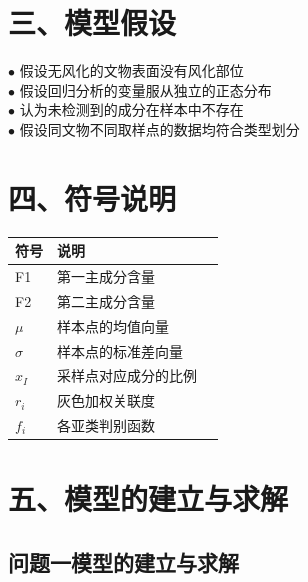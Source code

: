 \documentclass{my_paper}
\begin{document}
\section{三、模型假设}
\noindent
$\bullet$ 假设无风化的文物表面没有风化部位\\
$\bullet$ 假设回归分析的变量服从独立的正态分布\\ 
$\bullet$ 认为未检测到的成分在样本中不存在\\
$\bullet$ 假设同文物不同取样点的数据均符合类型划分
\section{四、符号说明}

\begin{table}[H]
    \centering
    \begin{tabular}{p{2.0cm}<{\centering}p{9.0cm}<{\centering}p{2.0cm}<{\centering}}
    \hline
    符号 & 说明  \\ %
    \hline
    F1&     第一主成分含量  \\
    F2&     第二主成分含量   \\
    $\mu$&   样本点的均值向量 \\
    $\sigma$& 样本点的标准差向量 \\
    $x_I$  &采样点对应成分的比例\\
    $r_i$ &灰色加权关联度 \\
    $f_i$ & 各亚类判别函数 \\\hline
    \end{tabular}
\end{table}

\section{五、模型的建立与求解}


\subsection{问题一模型的建立与求解}
\end{document}
